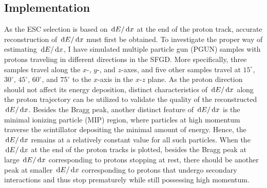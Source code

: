    \subsection{Implementation}
   \label{sec:sel-esc-imp}
	As the ESC selection is based on $\,\textrm{d}E/\,\textrm{d}x$ at the end of the proton track, accurate reconstruction of $\,\textrm{d}E/\,\textrm{d}x$ must first be obtained.
	To investigate the proper way of estimating $\,\textrm{d}E/\,\textrm{d}x$, I have simulated multiple particle gun (PGUN) samples with protons traveling in different directions in the SFGD.
	More specifically, three samples travel along the $x$-, $y$-, and $z$-axes, and five other samples travel at $15^\circ$, $30^\circ$, $45^\circ$, $60^\circ$, and $75^\circ$ to the $x$-axis in the $x$-$z$ plane.
	As the proton direction should not affect its energy deposition, distinct characteristics of $\,\textrm{d}E/\,\textrm{d}x$ along the proton trajectory can be utilized to validate the quality of the reconstructed $\,\textrm{d}E/\,\textrm{d}x$.
	Besides the Bragg peak, another distinct feature of $\,\textrm{d}E/\,\textrm{d}x$ is the minimal ionizing particle (MIP) region, where particles at high momentum traverse the scintillator depositing the minimal amount of energy. 
	Hence, the $\,\textrm{d}E/\,\textrm{d}x$ remains at a relatively constant value for all such particles.
	When the $\,\textrm{d}E/\,\textrm{d}x$ at the end of the proton tracks is plotted, besides the Bragg peak at large $\,\textrm{d}E/\,\textrm{d}x$ corresponding to protons stopping at rest, there should be another peak at smaller $\,\textrm{d}E/\,\textrm{d}x$ corresponding to protons that undergo secondary interactions and thus stop prematurely while still possessing high momentum.

